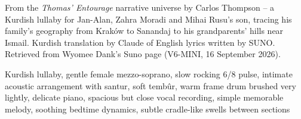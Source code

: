 
\label{sec:laye-layey-jan-alan}
\begin{notes}
From the \emph{Thomas' Entourage} narrative universe by Carlos Thompson -- a Kurdish lullaby for Jan-Alan, Zahra Moradi and Mihai Rusu's son, tracing his family's geography from Kraków to Sanandaj to his grandparents' hills near Ismail. Kurdish translation by Claude of English lyrics written by SUNO. Retrieved from Wyomee Dank's Suno page (V6-MINI, 16 September 2026).
\end{notes}
\begin{style}
Kurdish lullaby, gentle female mezzo-soprano, slow rocking 6/8 pulse, intimate acoustic arrangement with santur, soft tembûr, warm frame drum brushed very lightly, delicate piano, spacious but close vocal recording, simple memorable melody, soothing bedtime dynamics, subtle cradle-like swells between sections
\end{style}
